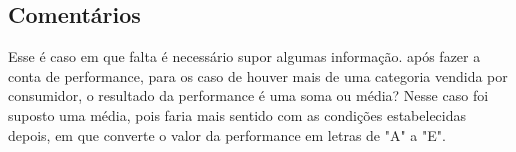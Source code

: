 \subsection*{Comentários}
Esse é caso em que falta é necessário supor algumas informação.
após fazer a conta de performance, para os caso de houver mais de uma categoria vendida por consumidor, o resultado da performance é uma soma ou média?
Nesse caso foi suposto uma média, pois faria mais sentido com as condições estabelecidas depois, em que converte o valor da performance em letras de "A" a "E".